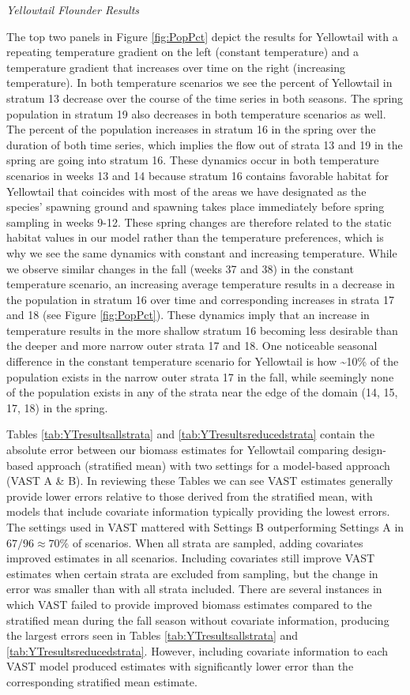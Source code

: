 \documentclass[
  12pt,
]{article}
\begin{document}
\emph{Yellowtail Flounder Results}

The top two panels in Figure \ref{fig:PopPct} depict the results for Yellowtail with a repeating temperature gradient on the left (constant temperature) and a temperature gradient that increases over time on the right (increasing temperature). In both temperature scenarios we see the percent of Yellowtail in stratum 13 decrease over the course of the time series in both seasons. The spring population in stratum 19 also decreases in both temperature scenarios as well. The percent of the population increases in stratum 16 in the spring over the duration of both time series, which implies the flow out of strata 13 and 19 in the spring are going into stratum 16. These dynamics occur in both temperature scenarios in weeks 13 and 14 because stratum 16 contains favorable habitat for Yellowtail that coincides with most of the areas we have designated as the species' spawning ground and spawning takes place immediately before spring sampling in weeks 9-12. These spring changes are therefore related to the static habitat values in our model rather than the temperature preferences, which is why we see the same dynamics with constant and increasing temperature. While we observe similar changes in the fall (weeks 37 and 38) in the constant temperature scenario, an increasing average temperature results in a decrease in the population in stratum 16 over time and corresponding increases in strata 17 and 18 (see Figure \ref{fig:PopPct}). These dynamics imply that an increase in temperature results in the more shallow stratum 16 becoming less desirable than the deeper and more narrow outer strata 17 and 18. One noticeable seasonal difference in the constant temperature scenario for Yellowtail is how \textasciitilde10\% of the population exists in the narrow outer strata 17 in the fall, while seemingly none of the population exists in any of the strata near the edge of the domain (14, 15, 17, 18) in the spring.

Tables \ref{tab:YTresultsallstrata} and \ref{tab:YTresultsreducedstrata} contain the absolute error between our biomass estimates for Yellowtail comparing design-based approach (stratified mean) with two settings for a model-based approach (VAST A \& B). In reviewing these Tables we can see VAST estimates generally provide lower errors relative to those derived from the stratified mean, with models that include covariate information typically providing the lowest errors. The settings used in VAST mattered with Settings B outperforming Settings A in \(67/96\approx 70\%\) of scenarios. When all strata are sampled, adding covariates improved estimates in all scenarios. Including covariates still improve VAST estimates when certain strata are excluded from sampling, but the change in error was smaller than with all strata included. There are several instances in which VAST failed to provide improved biomass estimates compared to the stratified mean during the fall season without covariate information, producing the largest errors seen in Tables \ref{tab:YTresultsallstrata} and \ref{tab:YTresultsreducedstrata}. However, including covariate information to each VAST model produced estimates with significantly lower error than the corresponding stratified mean estimate.
\end{document}
